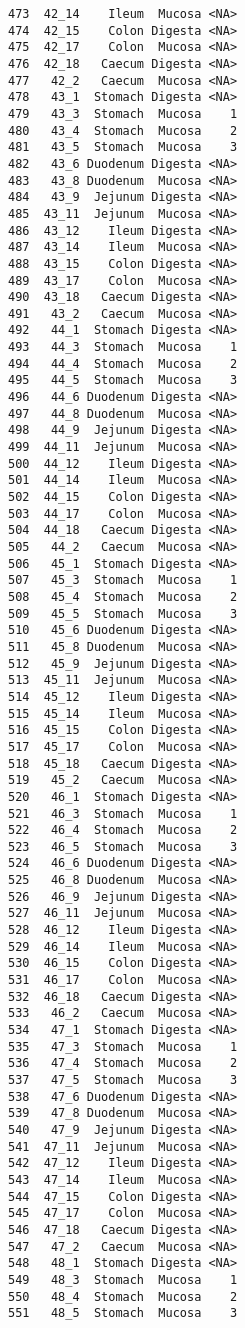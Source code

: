 \documentclass[
  letterpaper,
  DIV=11,
  numbers=noendperiod]{scrartcl}
\begin{document}
\begin{verbatim}
473  42_14    Ileum  Mucosa <NA>
474  42_15    Colon Digesta <NA>
475  42_17    Colon  Mucosa <NA>
476  42_18   Caecum Digesta <NA>
477   42_2   Caecum  Mucosa <NA>
478   43_1  Stomach Digesta <NA>
479   43_3  Stomach  Mucosa    1
480   43_4  Stomach  Mucosa    2
481   43_5  Stomach  Mucosa    3
482   43_6 Duodenum Digesta <NA>
483   43_8 Duodenum  Mucosa <NA>
484   43_9  Jejunum Digesta <NA>
485  43_11  Jejunum  Mucosa <NA>
486  43_12    Ileum Digesta <NA>
487  43_14    Ileum  Mucosa <NA>
488  43_15    Colon Digesta <NA>
489  43_17    Colon  Mucosa <NA>
490  43_18   Caecum Digesta <NA>
491   43_2   Caecum  Mucosa <NA>
492   44_1  Stomach Digesta <NA>
493   44_3  Stomach  Mucosa    1
494   44_4  Stomach  Mucosa    2
495   44_5  Stomach  Mucosa    3
496   44_6 Duodenum Digesta <NA>
497   44_8 Duodenum  Mucosa <NA>
498   44_9  Jejunum Digesta <NA>
499  44_11  Jejunum  Mucosa <NA>
500  44_12    Ileum Digesta <NA>
501  44_14    Ileum  Mucosa <NA>
502  44_15    Colon Digesta <NA>
503  44_17    Colon  Mucosa <NA>
504  44_18   Caecum Digesta <NA>
505   44_2   Caecum  Mucosa <NA>
506   45_1  Stomach Digesta <NA>
507   45_3  Stomach  Mucosa    1
508   45_4  Stomach  Mucosa    2
509   45_5  Stomach  Mucosa    3
510   45_6 Duodenum Digesta <NA>
511   45_8 Duodenum  Mucosa <NA>
512   45_9  Jejunum Digesta <NA>
513  45_11  Jejunum  Mucosa <NA>
514  45_12    Ileum Digesta <NA>
515  45_14    Ileum  Mucosa <NA>
516  45_15    Colon Digesta <NA>
517  45_17    Colon  Mucosa <NA>
518  45_18   Caecum Digesta <NA>
519   45_2   Caecum  Mucosa <NA>
520   46_1  Stomach Digesta <NA>
521   46_3  Stomach  Mucosa    1
522   46_4  Stomach  Mucosa    2
523   46_5  Stomach  Mucosa    3
524   46_6 Duodenum Digesta <NA>
525   46_8 Duodenum  Mucosa <NA>
526   46_9  Jejunum Digesta <NA>
527  46_11  Jejunum  Mucosa <NA>
528  46_12    Ileum Digesta <NA>
529  46_14    Ileum  Mucosa <NA>
530  46_15    Colon Digesta <NA>
531  46_17    Colon  Mucosa <NA>
532  46_18   Caecum Digesta <NA>
533   46_2   Caecum  Mucosa <NA>
534   47_1  Stomach Digesta <NA>
535   47_3  Stomach  Mucosa    1
536   47_4  Stomach  Mucosa    2
537   47_5  Stomach  Mucosa    3
538   47_6 Duodenum Digesta <NA>
539   47_8 Duodenum  Mucosa <NA>
540   47_9  Jejunum Digesta <NA>
541  47_11  Jejunum  Mucosa <NA>
542  47_12    Ileum Digesta <NA>
543  47_14    Ileum  Mucosa <NA>
544  47_15    Colon Digesta <NA>
545  47_17    Colon  Mucosa <NA>
546  47_18   Caecum Digesta <NA>
547   47_2   Caecum  Mucosa <NA>
548   48_1  Stomach Digesta <NA>
549   48_3  Stomach  Mucosa    1
550   48_4  Stomach  Mucosa    2
551   48_5  Stomach  Mucosa    3

\end{verbatim}
\end{document}
